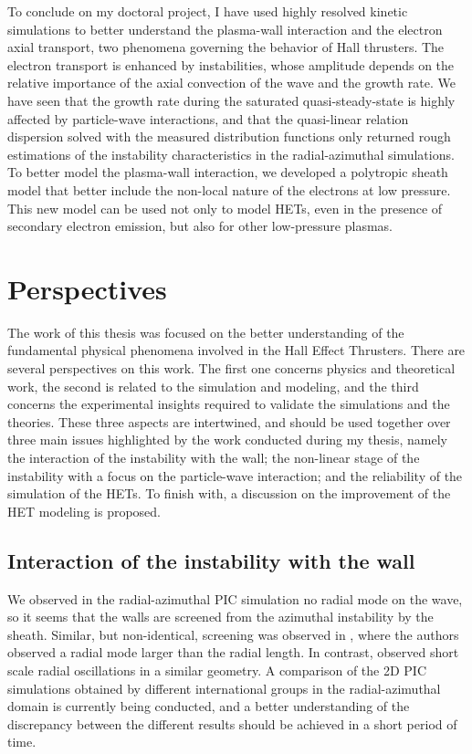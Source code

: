 \vspace{2em}
    To conclude on my doctoral project, I have used highly resolved kinetic simulations to better understand the plasma-wall interaction and the electron axial transport, two phenomena governing the behavior of Hall thrusters.
    The electron transport is enhanced by instabilities, whose amplitude depends on the relative importance of the axial convection of the wave and the growth rate.
    We have seen that the growth rate during the saturated quasi-steady-state is highly affected by particle-wave interactions, and that the quasi-linear relation dispersion solved with the measured distribution functions only returned rough estimations of the instability characteristics in the radial-azimuthal simulations.
    To better model the plasma-wall interaction, we developed a polytropic sheath model that better include the non-local nature of the electrons at low pressure.
    This new model can be used not only to model HETs, even in the presence of secondary electron emission, but also for other low-pressure plasmas.

    

\section{Perspectives}

  The work of this thesis was focused on the better understanding of the fundamental physical phenomena involved in the Hall Effect Thrusters.
  There are several perspectives on this work.
  The first one concerns physics and theoretical work, the second is related to the simulation and modeling, and the third concerns the experimental insights required to validate the simulations and the theories.
  These three aspects are intertwined, and should be used together over three main issues highlighted by the work conducted during my thesis, namely the interaction of the instability with the wall\string; the non-linear stage of the instability with a focus on the particle-wave interaction\string; and the reliability of the simulation of the HETs.
  To finish with, a discussion on the improvement of the HET modeling is proposed.

  \subsection{Interaction of the instability with the wall}

    We observed in the radial-azimuthal PIC simulation no radial mode on the wave, so it seems that the walls are screened from the azimuthal instability by the sheath.
    Similar, but non-identical, screening was observed in \citet{janhunen2018}, where the authors observed a radial mode larger than the radial length.
    In contrast, \citet{taccogna2019} observed short scale radial oscillations in a similar geometry.
    A comparison of the 2D PIC simulations obtained by different international groups in the radial-azimuthal domain is currently being conducted, and a better understanding of the discrepancy between the different results should be achieved in a short period of time.

